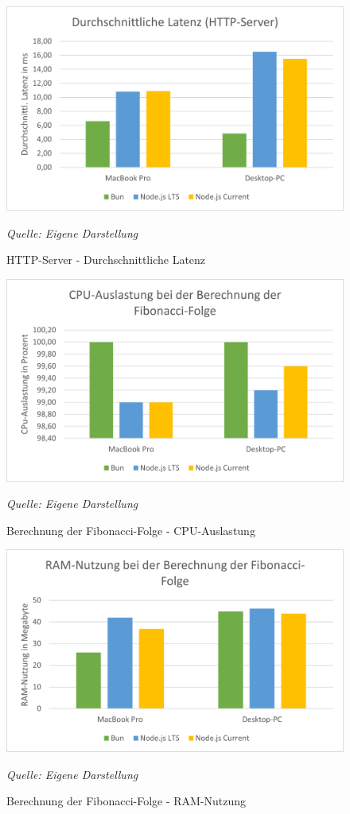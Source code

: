 \begin{figure}[h!]
	\centering
	\includegraphics[width=\linewidth]{./images/httpServerAverageLatency.png}
	\caption{HTTP-Server - Durchschnittliche Latenz}
	\label{fig:httpServerAverageLatency}
	\textit{Quelle: Eigene Darstellung}
\end{figure}

\begin{figure}[h!]
	\centering
	\includegraphics[width=\linewidth]{./images/fibonacciCpuUsage.png}
	\caption{Berechnung der Fibonacci-Folge - CPU-Auslastung}
	\label{fig:fibonacciCpuUsage}
	\textit{Quelle: Eigene Darstellung}
\end{figure}

\begin{figure}[h]
	\centering
	\includegraphics[width=\linewidth]{./images/fibonacciRamUsage.png}
	\caption{Berechnung der Fibonacci-Folge - RAM-Nutzung}
	\label{fig:fibonacciRamUsage}
	\textit{Quelle: Eigene Darstellung}
\end{figure}

